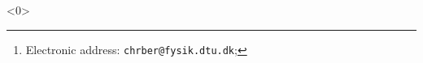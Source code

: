 \documentclass[a4paper,twoside]{article}
\title{}
\author[1]{Christian Berrig%
\thanks{Electronic address: \texttt{chrber@fysik.dtu.dk}; }}
\affil[1]{BigQ, QPIT, DTU}
\date{\today}
\begin{document}
\maketitle


<0>


\printbibliography      %
\end{document}
